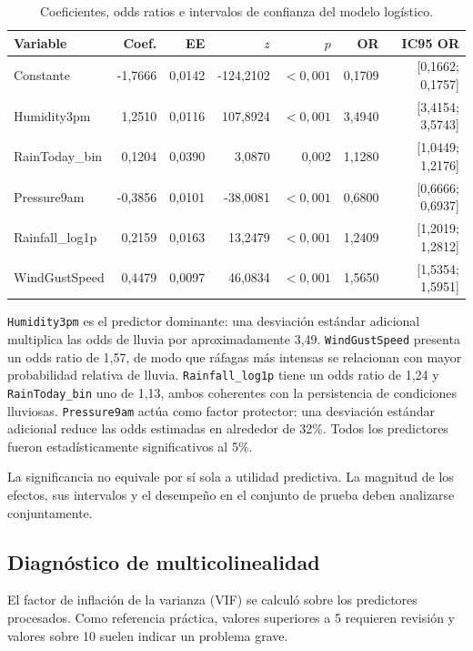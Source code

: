 \documentclass[11pt,a4paper]{article}
\begin{document}
\begin{table}[H]
\centering
\caption{Coeficientes, odds ratios e intervalos de confianza del modelo logístico.}
\scriptsize
\begin{tabular}{lrrrrrr}
\toprule
Variable & Coef. & EE & $z$ & $p$ & OR & IC95 OR \\
\midrule
Constante          & -1,7666 & 0,0142 & -124,2102 & $<0,001$ & 0,1709 & [0,1662; 0,1757] \\
Humidity3pm        &  1,2510 & 0,0116 &  107,8924 & $<0,001$ & 3,4940 & [3,4154; 3,5743] \\
RainToday\_bin    &  0,1204 & 0,0390 &    3,0870 & 0,002 & 1,1280 & [1,0449; 1,2176] \\
Pressure9am        & -0,3856 & 0,0101 &  -38,0081 & $<0,001$ & 0,6800 & [0,6666; 0,6937] \\
Rainfall\_log1p   &  0,2159 & 0,0163 &   13,2479 & $<0,001$ & 1,2409 & [1,2019; 1,2812] \\
WindGustSpeed      &  0,4479 & 0,0097 &   46,0834 & $<0,001$ & 1,5650 & [1,5354; 1,5951] \\
\bottomrule
\end{tabular}
\end{table}

\texttt{Humidity3pm} es el predictor dominante: una desviación estándar adicional multiplica las odds de lluvia por aproximadamente 3,49. \texttt{WindGustSpeed} presenta un odds ratio de 1,57, de modo que ráfagas más intensas se relacionan con mayor probabilidad relativa de lluvia. \texttt{Rainfall\_log1p} tiene un odds ratio de 1,24 y \texttt{RainToday\_bin} uno de 1,13, ambos coherentes con la persistencia de condiciones lluviosas. \texttt{Pressure9am} actúa como factor protector: una desviación estándar adicional reduce las odds estimadas en alrededor de 32\%. Todos los predictores fueron estadísticamente significativos al 5\%.

La significancia no equivale por sí sola a utilidad predictiva. La magnitud de los efectos, sus intervalos y el desempeño en el conjunto de prueba deben analizarse conjuntamente.

\subsection{Diagnóstico de multicolinealidad}
El factor de inflación de la varianza (VIF) se calculó sobre los predictores procesados. Como referencia práctica, valores superiores a 5 requieren revisión y valores sobre 10 suelen indicar un problema grave.
\end{document}
